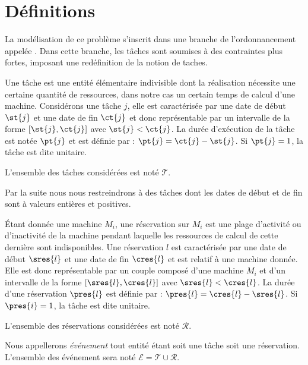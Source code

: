 \section{Définitions}
\label{intro_def}

La modélisation de ce problème s'inscrit dans une branche de l'ordonnancement appelée \isched. Dans
cette branche, les tâches sont soumises à des contraintes plus fortes, imposant une redéfinition de
la notion de taches.

\begin{ndf}[Tâche]
    Une tâche est une entité élémentaire indivisible dont la réalisation nécessite une certaine
    quantité de ressources, dans notre cas un certain temps de calcul d'une machine. Considérons une
    tâche $j$, elle est caractérisée par une date de début $\st{j}$ et une date de fin $\ct{j}$ et donc
    représentable par un intervalle de la forme $[\st{j}, \ct{j}]$ avec $\st{j} < \ct{j}$. La durée d'exécution
    de la tâche est notée $\pt{j}$ et est définie par : $\pt{j} = \ct{j} - \st{j}$. Si $\pt{j} = 1$,
    la tâche est dite unitaire.

    L'ensemble des tâches considérées est noté $\mathcal{T}$.
\end{ndf}

\begin{nrmq}
    Par la suite nous nous restreindrons à des tâches dont les dates de début et de fin sont à
    valeurs entières et positives.
\end{nrmq}

\begin{ndf}[Réservation]
    Étant donnée une machine $M_i$, une réservation sur $M_i$ est une plage d'activité ou
    d'inactivité de la machine pendant laquelle les ressources de calcul de cette dernière sont
    indisponibles. Une réservation $l$ est caractérisée par une date de début $\sres{l}$ et une date de fin
    $\cres{l}$ et est relatif à une machine donnée. Elle est donc représentable par un couple composé
    d'une machine $M_i$ et d'un intervalle de la forme $[\sres{l}, \cres{l}]$ avec $\sres{l} < \cres{l}$.
    La durée d'une réservation $\pres{l}$ est définie par :  $\pres{l} = \cres{l} - \sres{l}$. Si
    $\pres{i} = 1$, la tâche est dite unitaire.

    L'ensemble des réservations considérées est noté $\mathcal{R}$.
\end{ndf}

\begin{ndf}[Événements]
    Nous appellerons \emph{événement} tout entité étant soit une tâche soit une réservation.
    L'ensemble des événement sera noté $\mathcal{E} = \mathcal{T} \cup \mathcal{R}$.
\end{ndf}

